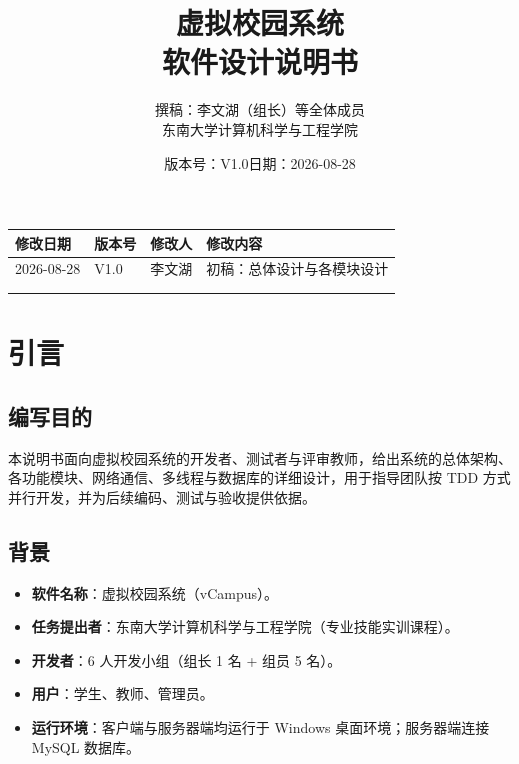 \documentclass[12pt,a4paper]{ctexart}
\title{\bfseries 虚拟校园系统\\[0.4em] 软件设计说明书}
\author{撰稿：李文湖（组长）等全体成员\\[0.6em] 东南大学计算机科学与工程学院}
\date{版本号：V1.0\quad 日期：2026-08-28}
\begin{document}
\maketitle
\thispagestyle{empty}

\begin{center}
\begin{tabular}{l l l l}
\toprule
修改日期 & 版本号 & 修改人 & 修改内容 \\
\midrule
2026-08-28 & V1.0 & 李文湖 & 初稿：总体设计与各模块设计 \\
\midrule
 &  &  & \\
\midrule
 &  &  & \\
\bottomrule
\end{tabular}
\end{center}

\newpage
\tableofcontents
\newpage

\section{引言}

\subsection{编写目的}
本说明书面向虚拟校园系统的开发者、测试者与评审教师，给出系统的总体架构、各功能模块、网络通信、多线程与数据库的详细设计，用于指导团队按 TDD 方式并行开发，并为后续编码、测试与验收提供依据。

\subsection{背景}
\begin{itemize}
  \item \textbf{软件名称}：虚拟校园系统（vCampus）。
  \item \textbf{任务提出者}：东南大学计算机科学与工程学院（专业技能实训课程）。
  \item \textbf{开发者}：6 人开发小组（组长 1 名 + 组员 5 名）。
  \item \textbf{用户}：学生、教师、管理员。
  \item \textbf{运行环境}：客户端与服务器端均运行于 Windows 桌面环境；服务器端连接 MySQL 数据库。
\end{itemize}
\end{document}
